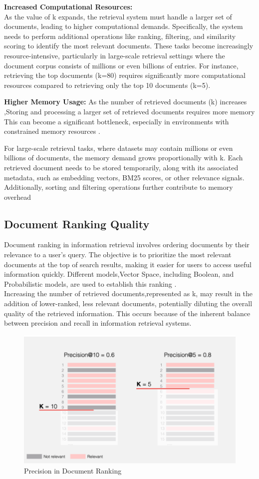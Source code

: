 \textbf{Increased Computational Resources:} \\
As the value of k expands, the retrieval system must handle a larger set of documents, leading to higher computational demands. Specifically, the system needs to perform additional operations like ranking, filtering, and similarity scoring to identify the most relevant documents. These tasks become increasingly resource-intensive, particularly in large-scale retrieval settings where the document corpus consists of millions or even billions of entries\cite{manning2008ir}. For instance, retrieving the top  documents (k=80) requires significantly more computational resources compared to retrieving only the top 10 documents (k=5). 

\textbf{Higher Memory Usage:}
As the number of retrieved documents (k) increases ,Storing and processing a larger set of retrieved documents requires more memory This can become a significant bottleneck, especially in environments with constrained memory resources .

For large-scale retrieval tasks, where datasets may contain millions or even billions of documents, the memory demand grows proportionally with 
k. Each retrieved document needs to be stored temporarily, along with its associated metadata, such as embedding vectors, BM25 scores, or other relevance signals. Additionally, sorting and filtering operations further contribute to memory overhead
\subsection{Document Ranking Quality}
Document ranking in information retrieval involves ordering documents by their relevance to a user's query. The objective is to prioritize the most relevant documents at the top of search results, making it easier for users to access useful information quickly. Different models,Vector Space, including Boolean, and Probabilistic models, are used to establish this ranking \cite{enwiki:1262179867}.\\

Increasing the number of retrieved documents,represented as k, may result in the addition of lower-ranked, less relevant documents, potentially diluting the overall quality of the retrieved information. This occurs because of the inherent balance between precision and recall in information retrieval systems.
\begin{figure}[h]
	\centering
	\includegraphics[width=0.7\linewidth]{Figures/precisionR.png}
	\caption{Precision in Document Ranking}
	\label{precisionR}
	
\end{figure}

